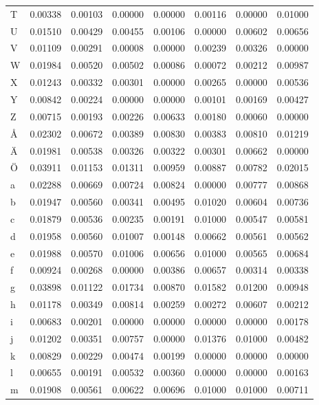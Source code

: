 \begin{tabularx}{\textwidth}{X|c|c|c|c|c|c|c}
T & 0.00338 &  0.00103 &  0.00000 &  0.00000 &  0.00116 &  0.00000 &  0.01000 \\
U & 0.01510 &  0.00429 &  0.00455 &  0.00106 &  0.00000 &  0.00602 &  0.00656 \\
V & 0.01109 &  0.00291 &  0.00008 &  0.00000 &  0.00239 &  0.00326 &  0.00000 \\
W & 0.01984 &  0.00520 &  0.00502 &  0.00086 &  0.00072 &  0.00212 &  0.00987 \\
X & 0.01243 &  0.00332 &  0.00301 &  0.00000 &  0.00265 &  0.00000 &  0.00536 \\
Y & 0.00842 &  0.00224 &  0.00000 &  0.00000 &  0.00101 &  0.00169 &  0.00427 \\
Z & 0.00715 &  0.00193 &  0.00226 &  0.00633 &  0.00180 &  0.00060 &  0.00000 \\
Å & 0.02302 &  0.00672 &  0.00389 &  0.00830 &  0.00383 &  0.00810 &  0.01219 \\
Ä & 0.01981 &  0.00538 &  0.00326 &  0.00322 &  0.00301 &  0.00662 &  0.00000 \\
Ö & 0.03911 &  0.01153 &  0.01311 &  0.00959 &  0.00887 &  0.00782 &  0.02015 \\
a & 0.02288 &  0.00669 &  0.00724 &  0.00824 &  0.00000 &  0.00777 &  0.00868 \\
b & 0.01947 &  0.00560 &  0.00341 &  0.00495 &  0.01020 &  0.00604 &  0.00736 \\
c & 0.01879 &  0.00536 &  0.00235 &  0.00191 &  0.01000 &  0.00547 &  0.00581 \\
d & 0.01958 &  0.00560 &  0.01007 &  0.00148 &  0.00662 &  0.00561 &  0.00562 \\
e & 0.01988 &  0.00570 &  0.01006 &  0.00656 &  0.01000 &  0.00565 &  0.00684 \\
f & 0.00924 &  0.00268 &  0.00000 &  0.00386 &  0.00657 &  0.00314 &  0.00338 \\
g & 0.03898 &  0.01122 &  0.01734 &  0.00870 &  0.01582 &  0.01200 &  0.00948 \\
h & 0.01178 &  0.00349 &  0.00814 &  0.00259 &  0.00272 &  0.00607 &  0.00212 \\
i & 0.00683 &  0.00201 &  0.00000 &  0.00000 &  0.00000 &  0.00000 &  0.00178 \\
j & 0.01202 &  0.00351 &  0.00757 &  0.00000 &  0.01376 &  0.01000 &  0.00482 \\
k & 0.00829 &  0.00229 &  0.00474 &  0.00199 &  0.00000 &  0.00000 &  0.00000 \\
l & 0.00655 &  0.00191 &  0.00532 &  0.00360 &  0.00000 &  0.00000 &  0.00163 \\
m & 0.01908 &  0.00561 &  0.00622 &  0.00696 &  0.01000 &  0.01000 &  0.00711 \\
\end{tabularx}

